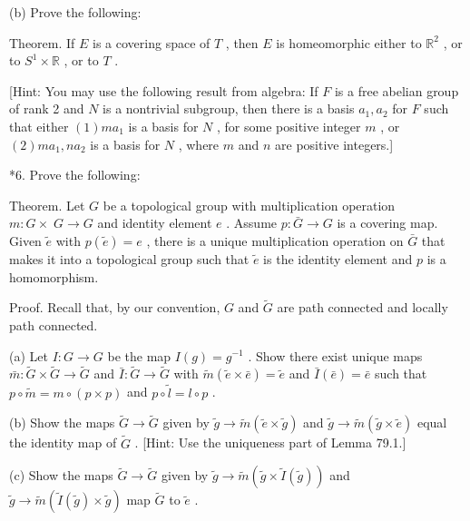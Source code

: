 \documentclass[10pt]{article}
\begin{document}
(b) Prove the following:

Theorem. If \(E\) is a covering space of \(T\) , then \(E\) is homeomorphic either to \({\mathbb{R}}^{2}\) , or to \({S}^{1} \times  \mathbb{R}\) , or to \(T\) .

[Hint: You may use the following result from algebra: If \(F\) is a free abelian group of rank 2 and \(N\) is a nontrivial subgroup, then there is a basis \({a}_{1},{a}_{2}\) for \(F\) such that either \(\left( 1\right) m{a}_{1}\) is a basis for \(N\) , for some positive integer \(m\) , or \(\left( 2\right) m{a}_{1},n{a}_{2}\) is a basis for \(N\) , where \(m\) and \(n\) are positive integers.]

*6. Prove the following:

Theorem. Let \(G\) be a topological group with multiplication operation \(m : G \times \; G \rightarrow  G\) and identity element \(e\) . Assume \(p : \bar{G} \rightarrow  G\) is a covering map. Given \(\widetilde{e}\) with \(p\left( \widetilde{e}\right)  = e\) , there is a unique multiplication operation on \(\bar{G}\) that makes it into a topological group such that \(\widetilde{e}\) is the identity element and \(p\) is a homomorphism.

Proof. Recall that, by our convention, \(G\) and \(\widetilde{G}\) are path connected and locally path connected.

(a) Let \(I : G \rightarrow  G\) be the map \(I\left( g\right)  = {g}^{-1}\) . Show there exist unique maps \(\bar{m} : \widetilde{G} \times  \widetilde{G} \rightarrow  \widetilde{G}\) and \(\bar{I} : \widetilde{G} \rightarrow  \widetilde{G}\) with \(\widetilde{m}\left( {\widetilde{e} \times  \bar{e}}\right)  = \widetilde{e}\) and \(\bar{I}\left( \bar{e}\right)  = \bar{e}\) such that \(p \circ  \widetilde{m} = m \circ  \left( {p \times  p}\right)\) and \(p \circ  \widetilde{l} = l \circ  p\) .

(b) Show the maps \(\widetilde{G} \rightarrow  \widetilde{G}\) given by \(\widetilde{g} \rightarrow  \widetilde{m}\left( {\widetilde{e} \times  \widetilde{g}}\right)\) and \(\widetilde{g} \rightarrow  \widetilde{m}\left( {\widetilde{g} \times  \widetilde{e}}\right)\) equal the identity map of \(\widetilde{G}\) . [Hint: Use the uniqueness part of Lemma 79.1.]

(c) Show the maps \(\widetilde{G} \rightarrow  \widetilde{G}\) given by \(\widetilde{g} \rightarrow  \widetilde{m}\left( {\widetilde{g} \times  \widetilde{I}\left( \widetilde{g}\right) }\right)\) and \(\widetilde{g} \rightarrow  \widetilde{m}\left( {\widetilde{I}\left( \widetilde{g}\right)  \times  \widetilde{g}}\right)\) map \(\widetilde{G}\) to \(\widetilde{e}\) .
\end{document}
